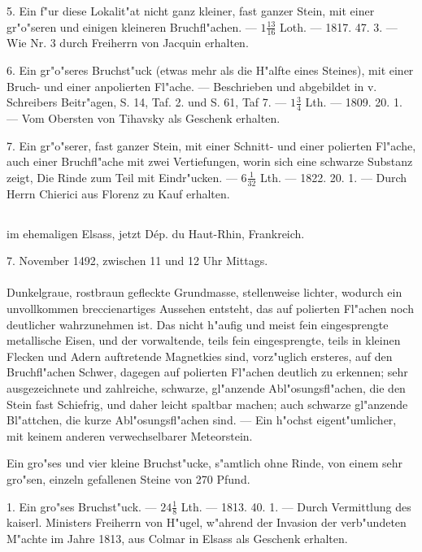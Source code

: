 \documentclass[a4paper, 11pt, oneside, polutonikogreek, german]{article}
\begin{document}
5. Ein f"ur diese Lokalit"at nicht ganz kleiner, fast ganzer Stein, mit einer gr"o"seren und einigen kleineren Bruchfl"achen. --- $1\frac{13}{16}$ Loth. --- 1817. 47. 3. --- Wie Nr. 3 durch Freiherrn von Jacquin erhalten.

6. Ein gr"o"seres Bruchst"uck (etwas mehr als die H"alfte eines Steines), mit einer Bruch- und einer anpolierten Fl"ache. --- Beschrieben und abgebildet in v. Schreibers Beitr"agen, S. 14, Taf. 2. und S. 61, Taf 7. --- $1\frac{3}{4}$ Lth. --- 1809. 20. 1. --- Vom Obersten von Tihavsky als Geschenk erhalten.

7. Ein gr"o"serer, fast ganzer Stein, mit einer Schnitt- und einer polierten Fl"ache, auch einer Bruchfl"ache mit zwei Vertiefungen, worin sich eine schwarze Substanz zeigt, Die Rinde zum Teil mit Eindr"ucken. --- $6\frac{1}{32}$ Lth. --- 1822. 20. 1. --- Durch Herrn Chierici aus Florenz zu Kauf erhalten.
\subsection[\frakfamily{Ensisheim.}]{}
\begin{center}

im ehemaligen Elsass, jetzt Dép. du Haut-Rhin, Frankreich.

7. November 1492, zwischen 11 und 12 Uhr Mittags.
\end{center}
\paragraph{}
Dunkelgraue, rostbraun gefleckte Grundmasse, stellenweise lichter, wodurch ein unvollkommen breccienartiges Aussehen entsteht, das auf polierten Fl"achen noch deutlicher wahrzunehmen ist. Das nicht h"aufig und meist fein eingesprengte metallische Eisen, und der vorwaltende, teils fein eingesprengte, teils in kleinen Flecken und Adern auftretende Magnetkies sind, vorz"uglich ersteres, auf den Bruchfl"achen Schwer, dagegen auf polierten Fl"achen deutlich zu erkennen; sehr ausgezeichnete und zahlreiche, schwarze, gl"anzende Abl"osungsfl"achen, die den Stein fast Schiefrig, und daher leicht spaltbar machen; auch schwarze gl"anzende Bl"attchen‚ die kurze Abl"osungsfl"achen sind. --- Ein h"ochst eigent"umlicher, mit keinem anderen verwechselbarer Meteorstein.

Ein gro"ses und vier kleine Bruchst"ucke, s"amtlich ohne Rinde, von einem sehr gro"sen, einzeln gefallenen Steine von 270 Pfund.

1. Ein gro"ses Bruchst"uck. --- $24\frac{1}{8}$ Lth. --- 1813. 40. 1. --- Durch Vermittlung des kaiserl. Ministers Freiherrn von H"ugel, w"ahrend der Invasion der verb"undeten M"achte im Jahre 1813, aus Colmar in Elsass als Geschenk erhalten.
\end{document}
